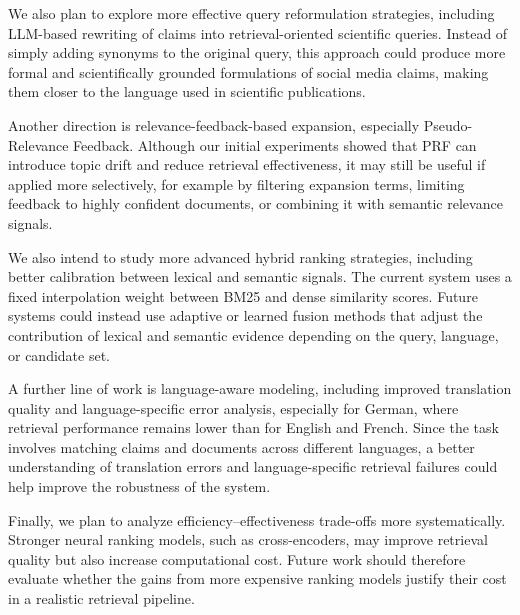 We also plan to explore more effective query reformulation strategies, including LLM-based rewriting of claims into retrieval-oriented scientific queries. Instead of simply adding synonyms to the original query, this approach could produce more formal and scientifically grounded formulations of social media claims, making them closer to the language used in scientific publications.

Another direction is relevance-feedback-based expansion, especially Pseudo-Relevance Feedback. Although our initial experiments showed that PRF can introduce topic drift and reduce retrieval effectiveness, it may still be useful if applied more selectively, for example by filtering expansion terms, limiting feedback to highly confident documents, or combining it with semantic relevance signals.

We also intend to study more advanced hybrid ranking strategies, including better calibration between lexical and semantic signals. The current system uses a fixed interpolation weight between BM25 and dense similarity scores. Future systems could instead use adaptive or learned fusion methods that adjust the contribution of lexical and semantic evidence depending on the query, language, or candidate set.

A further line of work is language-aware modeling, including improved translation quality and language-specific error analysis, especially for German, where retrieval performance remains lower than for English and French. Since the task involves matching claims and documents across different languages, a better understanding of translation errors and language-specific retrieval failures could help improve the robustness of the system.

Finally, we plan to analyze efficiency--effectiveness trade-offs more systematically. Stronger neural ranking models, such as cross-encoders, may improve retrieval quality but also increase computational cost. Future work should therefore evaluate whether the gains from more expensive ranking models justify their cost in a realistic retrieval pipeline.
